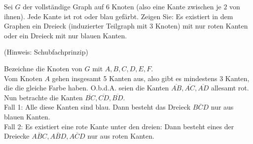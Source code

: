 
\begin{exercise}

Sei $G$ der vollständige Graph auf $6$ Knoten (also eine Kante zwischen je $2$ von ihnen).
Jede Kante ist rot oder blau gefärbt.
Zeigen Sie:
Es existiert in dem Graphen ein Dreieck (induzierter Teilgraph mit $3$ Knoten) mit nur roten Kanten oder ein Dreieck mit nur blauen Kanten.

(Hinweis: Schubfachprinzip)

\end{exercise}




\begin{solution}

Bezeichne die Knoten von $G$ mit $A,B,C,D,E,F$. \\
Vom Knoten $A$ gehen insgesamt 5 Kanten aus, also gibt es mindestens 3 Kanten, die die gleiche Farbe haben.
O.b.d.A. seien die Kanten $\overline{AB}, \overline{AC}, \overline{AD}$ allesamt rot. \\
Nun betrachte die Kanten $\overline{BC}, \overline{CD}, \overline{BD}$. \\
Fall 1: Alle diese Kanten sind blau. Dann besteht das Dreieck $\overline{BCD}$ nur aus blauen Kanten. \\
Fall 2: Es existiert eine rote Kante unter den dreien: Dann besteht eines
der Dreiecke $\overline{ABC}, \overline{ABD}, \overline{ACD}$ nur aus roten Kanten.

\end{solution}


